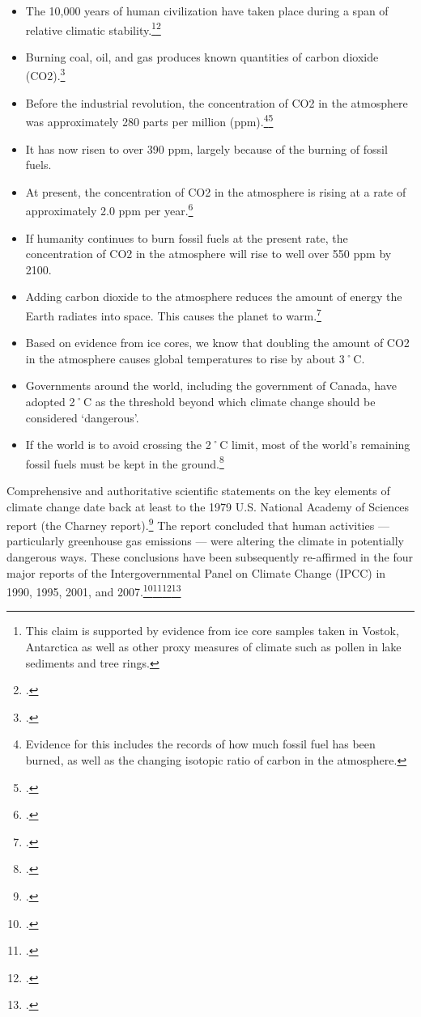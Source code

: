 \begin{itemize}
	\item The 10,000 years of human civilization have taken place during a span of relative climatic stability.\footnote{This claim is supported by evidence from ice core samples taken in Vostok, Antarctica as well as other proxy measures of climate such as pollen in lake sediments and tree rings.}\footcite[][p. 4]{Alley2000}
	\item Burning coal, oil, and gas produces known quantities of carbon dioxide (CO2).\footcite[For example, the U.S. Environmental Protection Agency lists quantities of CO2 produced by burning a barrel of oil, metric tonne of coal, or therm of natural gas:][]{CalculationsReferences}
	\item Before the industrial revolution, the concentration of CO2 in the atmosphere was approximately 280 parts per million (ppm).\footnote{Evidence for this includes the records of how much fossil fuel has been burned, as well as the changing isotopic ratio of carbon in the atmosphere.}\footcite[][]{IPCC4ARdrivers}
	\item It has now risen to over 390 ppm, largely because of the burning of fossil fuels.
	\item At present, the concentration of CO2 in the atmosphere is rising at a rate of approximately 2.0 ppm per year.\footcite[][]{NOAATrends}
	\item If humanity continues to burn fossil fuels at the present rate, the concentration of CO2 in the atmosphere will rise to well over 550 ppm by 2100.
	\item Adding carbon dioxide to the atmosphere reduces the amount of energy the Earth radiates into space. This causes the planet to warm.\footcite[][]{IPCC4ARdrivers}
	\item Based on evidence from ice cores, we know that doubling the amount of CO2 in the atmosphere causes global temperatures to rise by about 3˚C.
	\item Governments around the world, including the government of Canada, have adopted 2˚C as the threshold beyond which climate change should be considered `dangerous'.
	\item If the world is to avoid crossing the 2˚C limit, most of the world's remaining fossil fuels must be kept in the ground.\footcite[][]{IEA2012}
\end{itemize}



Comprehensive and authoritative scientific statements on the key elements of climate change date back at least to the 1979 U.S. National Academy of Sciences report (the Charney report).\footcite[][]{Charney1979}
The report concluded that human activities --- particularly greenhouse gas emissions --- were altering the climate in potentially dangerous ways. These conclusions have been subsequently re-affirmed in the four major reports of the Intergovernmental Panel on Climate Change (IPCC) in 1990, 1995, 2001, and 2007.\footcite[][]{IPCC1990}\footcite[][]{IPCC1995}\footcite[][]{IPCC2001}\footcite[][]{IPCC2007}


